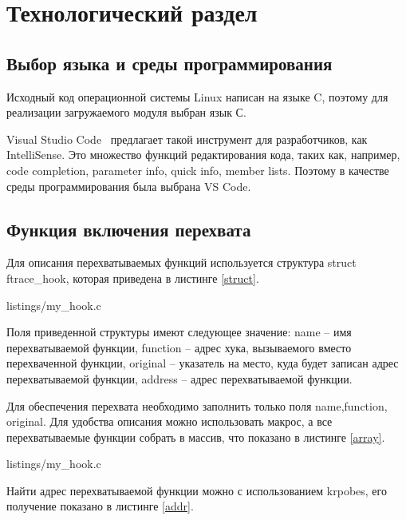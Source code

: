 \section{Технологический раздел}

\subsection{Выбор языка и среды программирования}

Исходный код операционной системы Linux написан на языке C, поэтому для реализации загружаемого модуля выбран язык С.

Visual Studio Code~\cite{vscode} предлагает такой инструмент для разработчиков, как IntelliSense.
Это множество функций редактирования кода, таких как, например, code completion, parameter info, quick info, member lists.
Поэтому в качестве среды программирования была выбрана VS Code.


\subsection{Функция включения перехвата}

Для описания перехватываемых функций используется структура struct ftrace\_hook, которая приведена в листинге \ref{struct}.


{listings/my_hook.c}

Поля приведенной структуры имеют следующее значение: name -- имя перехватываемой функции, function -- адрес хука, вызываемого вместо перехваченной функции, original -- указатель на место, куда будет записан адрес перехватываемой функции, address -- адрес перехватываемой функции.

Для обеспечения перехвата \cite{code} необходимо заполнить только поля name,\newline function, original. Для удобства описания можно использовать макрос, а все перехватываемые функции собрать в массив, что показано в листинге \ref{array}.

\pagebreak


{listings/my_hook.c}

Найти адрес перехватываемой функции можно с использованием krpobes, его получение показано в листинге \ref{addr}.

